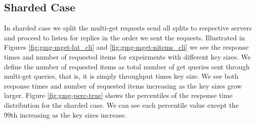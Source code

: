 \documentclass[11pt,a4paper]{article}
\begin{document}
\subsection{Sharded Case} \label{sec:gmg-true}
In sharded case we split the multi-get requests send all splits to respective servers and proceed to listen for replies in the order we sent the requests. Illustrated in Figures \ref{fig:gmg-mget-lat_cli} and \ref{fig:gmg-mget-nitems_cli} we see the response times and number of requested items for expeirments with different key sizes. We define the number of requested items as total number of get queries sent through multi-get queries, that is, it is simply throughput times key size. We see both response times and number of requested items increasing as the key sizes grow larger. Figure \ref{fig:gmg-perc-true} shows the percentiles of the response time distribution for the sharded case. We can see each percentile value except the 99th increasing as the key sizes increase.
\end{document}
